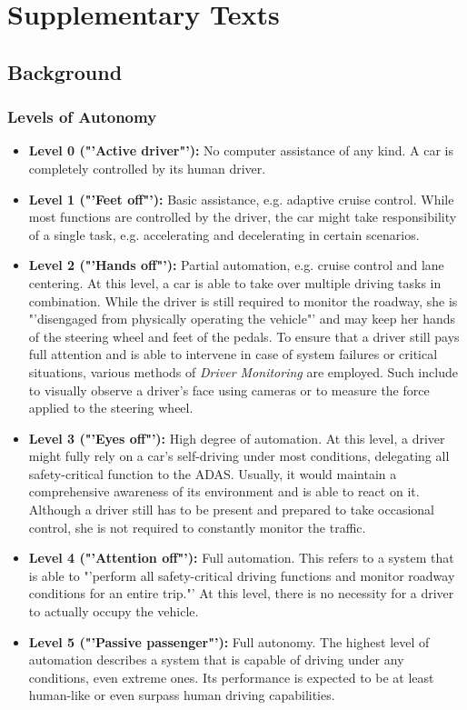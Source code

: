 \chapter{Supplementary Texts}
\label{appendix:background:supplementary_texts}

\section{Background}
\label{sec:appendix:texts:background}

\subsection{Levels of Autonomy}
\label{subsec:appendix:texts:background:levels_of_autonomy}
\begin{itemize}
	\item \textbf{Level 0 ("'Active driver"'):} No computer assistance of any kind. A car is completely controlled by its human driver.
	\item \textbf{Level 1 ("'Feet off"'):} Basic assistance, e.g. adaptive cruise control. While most functions are controlled by the driver, the car might take responsibility of a single task, e.g. accelerating and decelerating in certain scenarios.
	\item \textbf{Level 2 ("'Hands off"'):} Partial automation, e.g. cruise control and lane centering. At this level, a car is able to take over multiple driving tasks in combination. While the driver is still required to monitor the roadway, she is "'disengaged from physically operating the vehicle"' \cite{Klein} and may keep her hands of the steering wheel and feet of the pedals. To ensure that a driver still pays full attention and is able to intervene in case of system failures or critical situations, various methods of \textit{Driver Monitoring} are employed. Such include to visually observe a driver's face using cameras or to measure the force applied to the steering wheel.
	\item \textbf{Level 3 ("'Eyes off"'):} High degree of automation. At this level, a driver might fully rely on a car's self-driving under most conditions, delegating all safety-critical function to the ADAS. Usually, it would maintain a comprehensive awareness of its environment and is able to react on it. Although a driver still has to be present and prepared to take occasional control, she is not required to constantly monitor the traffic. 
	\item \textbf{Level 4 ("'Attention off"'):} Full automation. This refers to a system that is able to "'perform all safety-critical driving functions and monitor roadway conditions for an entire trip."' \cite{2016transportation} At this level, there is no necessity for a driver to actually occupy the vehicle.
	\item \textbf{Level 5 ("'Passive passenger"'):} Full autonomy. The highest level of automation describes a system that is capable of driving under any conditions, even extreme ones. Its performance is expected to be at least human-like or even surpass human driving capabilities. 
\end{itemize}

